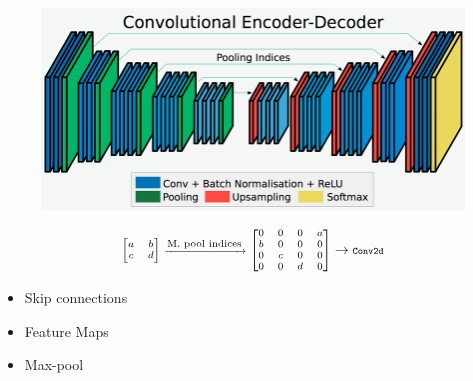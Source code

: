 \documentclass[
]{dtuposter}
\begin{document}
\begin{dtupostercontent}
\begin{figure}
	\centering
	\includegraphics[width=0.9\linewidth]{Encoder-Decoder2}
	\caption{}
	\label{fig:Structure}
\end{figure}
 
\begin{equation*}\label{key}
\scriptsize
\begin{bmatrix}a&b\\c&d\end{bmatrix} \xrightarrow{\text{\scriptsize M. pool indices}}
\begin{bmatrix}0&0&0&a\\b&0&0&0\\0&c&0&0\\0&0&d&0\end{bmatrix} 
\rightarrow 
\texttt{\scriptsize Conv2d}
\end{equation*}

\begin{itemize}
	\item Skip connections
	\item Feature Maps
	\item Max-pool
\end{itemize}




\end{dtupostercontent}
\end{document}
